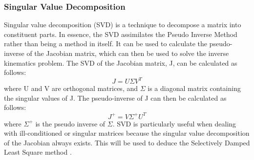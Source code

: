 \documentclass[conference]{IEEEtran}
\begin{document}
\subsubsection{Singular Value Decomposition}
Singular value decomposition (SVD) is a technique to decompose a matrix into constituent parts. In essence, the SVD assimilates the Pseudo Inverse Method rather than being a method in itself. It can be used to calculate the pseudo-inverse of the Jacobian matrix, which can then be used to solve the inverse kinematics problem. The SVD of the Jacobian matrix, J, can be calculated as follows:
\begin{equation}
J = U\Sigma V^T
\end{equation}
where U and V are orthogonal matrices, and $\Sigma$ is a diagonal matrix containing the singular values of J. The pseudo-inverse of J can then be calculated as follows:
\begin{equation}
J^+ = V\Sigma^+U^T
\end{equation}
where $\Sigma^+$ is the pseudo inverse of $\Sigma$. SVD is particularly useful when dealing with ill-conditioned or singular matrices because the singular value decomposition of the Jacobian always exists. This will be used to deduce the Selectively Damped Least Square method \cite{buss_selectively_2005}.
\end{document}
